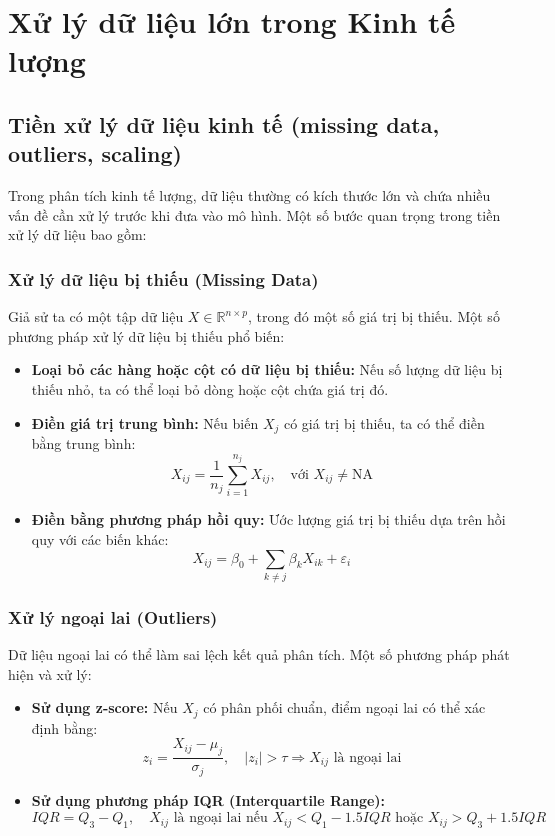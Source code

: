 \chapter{Xử lý dữ liệu lớn trong Kinh tế lượng}
\section{Tiền xử lý dữ liệu kinh tế (missing data, outliers, scaling)}
Trong phân tích kinh tế lượng, dữ liệu thường có kích thước lớn và chứa nhiều vấn đề cần xử lý trước khi đưa vào mô hình. Một số bước quan trọng trong tiền xử lý dữ liệu bao gồm:

\subsection{Xử lý dữ liệu bị thiếu (Missing Data)}
Giả sử ta có một tập dữ liệu $X \in \mathbb{R}^{n \times p}$, trong đó một số giá trị bị thiếu. Một số phương pháp xử lý dữ liệu bị thiếu phổ biến:
\begin{itemize}
    \item \textbf{Loại bỏ các hàng hoặc cột có dữ liệu bị thiếu:} Nếu số lượng dữ liệu bị thiếu nhỏ, ta có thể loại bỏ dòng hoặc cột chứa giá trị đó.
    \item \textbf{Điền giá trị trung bình:} Nếu biến $X_j$ có giá trị bị thiếu, ta có thể điền bằng trung bình:
    \begin{equation}
        X_{ij} = \frac{1}{n_j} \sum_{i=1}^{n_j} X_{ij}, \quad \text{với } X_{ij} \neq \text{NA}
    \end{equation}
    \item \textbf{Điền bằng phương pháp hồi quy:} Ước lượng giá trị bị thiếu dựa trên hồi quy với các biến khác:
    \begin{equation}
        X_{ij} = \beta_0 + \sum_{k \neq j} \beta_k X_{ik} + \varepsilon_i
    \end{equation}
\end{itemize}

\subsection{Xử lý ngoại lai (Outliers)}
Dữ liệu ngoại lai có thể làm sai lệch kết quả phân tích. Một số phương pháp phát hiện và xử lý:
\begin{itemize}
    \item \textbf{Sử dụng z-score:} Nếu $X_j$ có phân phối chuẩn, điểm ngoại lai có thể xác định bằng:
    \begin{equation}
        z_i = \frac{X_{ij} - \mu_j}{\sigma_j}, \quad |z_i| > \tau \Rightarrow X_{ij} \text{ là ngoại lai}
    \end{equation}
    \item \textbf{Sử dụng phương pháp IQR (Interquartile Range):}
    \begin{equation}
        IQR = Q_3 - Q_1, \quad X_{ij} \text{ là ngoại lai nếu } X_{ij} < Q_1 - 1.5 IQR \text{ hoặc } X_{ij} > Q_3 + 1.5 IQR
    \end{equation}
\end{itemize}


